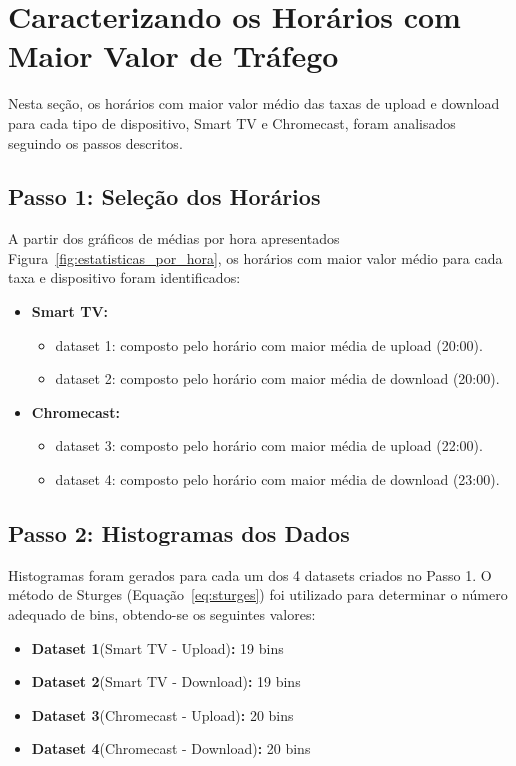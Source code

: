 \section{Caracterizando os Horários com Maior Valor de Tráfego}

Nesta seção, os horários com maior valor médio das taxas de upload e download para cada tipo de dispositivo, Smart TV e Chromecast, foram analisados seguindo os passos descritos.

\subsection{Passo 1: Seleção dos Horários}

A partir dos gráficos de médias por hora apresentados Figura~\ref{fig:estatisticas_por_hora}, os horários com maior valor médio para cada taxa e dispositivo foram identificados:
\begin{itemize}
    \item \textbf{Smart TV:}
        \begin{itemize}
            \item dataset 1: composto pelo horário com maior média de upload (20:00).
            \item dataset 2: composto pelo horário com maior média de download (20:00).
        \end{itemize}
    \item \textbf{Chromecast:}
        \begin{itemize}
            \item dataset 3: composto pelo horário com maior média de upload (22:00).
            \item dataset 4: composto pelo horário com maior média de download (23:00).
        \end{itemize}
\end{itemize}

\subsection{Passo 2: Histogramas dos Dados} \label{sec:histogramas}

Histogramas foram gerados para cada um dos 4 datasets criados no Passo 1. O método de Sturges (Equação~\ref{eq:sturges}) foi utilizado para determinar o número adequado de bins, obtendo-se os seguintes valores:

\begin{itemize}
    \item \textbf{Dataset 1}(Smart TV - Upload)\textbf{:}  19 bins
    \item \textbf{Dataset 2}(Smart TV - Download)\textbf{:}  19 bins
    \item \textbf{Dataset 3}(Chromecast - Upload)\textbf{:}  20 bins
    \item \textbf{Dataset 4}(Chromecast - Download)\textbf{:}  20 bins
\end{itemize}

